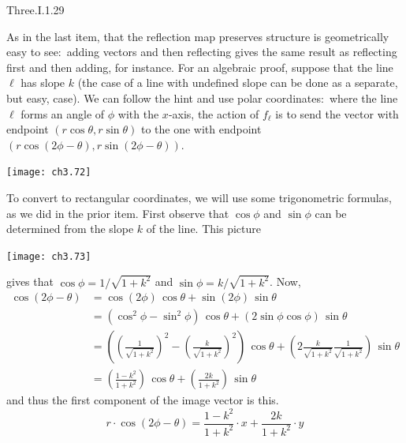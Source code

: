 \begin{ans}{Three.I.1.29}
\begin{exparts}
          As in the last item, that the reflection map preserves
          structure is geometrically easy to see:~adding vectors and then
          reflecting gives the same result as reflecting first and then
          adding, for instance.
          For an algebraic proof, suppose that the line $\ell$ has slope $k$
          (the case of a line with undefined slope can be done as a separate,
          but easy, case).
          We can follow the hint and use
          polar coordinates:~where the line \( \ell \) forms an angle of
          \( \phi \) with the \( x \)-axis, the action of \( f_\ell \) is to
          send the vector with endpoint \( (r\cos\theta,r\sin\theta) \) to
          the one with endpoint
          \( (r\cos(2\phi-\theta),r\sin(2\phi-\theta)) \).
          \begin{center}  \small
            \texttt{[image: ch3.72]}
          \end{center}
          To convert to rectangular coordinates, we will use some trigonometric
          formulas, as we  did in the prior item.
          First observe that $\cos\phi$ and $\sin\phi$ can be determined
          from the slope $k$ of the line.
          This picture
          \begin{center}  \small
            \texttt{[image: ch3.73]}
          \end{center}
          gives that $\cos\phi=1/\sqrt{1+k^2}$ and $\sin\phi=k/\sqrt{1+k^2}$.
          Now,
          \begin{align*}
            \cos(2\phi-\theta)
              &=\cos(2\phi)\,\cos\theta+\sin(2\phi)\,\sin\theta        \\
              &=\left(\cos^2\phi-\sin^2\phi\right)\,\cos\theta
                 +\left(2\sin\phi\cos\phi\right)\,\sin\theta        \\
              &=\left((\frac{1}{\sqrt{1+k^2}})^2
                      -(\frac{k}{\sqrt{1+k^2}})^2\right)
                   \,\cos\theta
                 +\left(2\frac{k}{\sqrt{1+k^2}}\frac{1}{\sqrt{1+k^2}}\right)
                   \,\sin\theta        \\
              &=\left(\frac{1-k^2}{1+k^2}\right)\,\cos\theta
                 +\left(\frac{2k}{1+k^2}\right)\,\sin\theta
          \end{align*}
          and thus the first component of the image vector is this.
          \begin{equation*}
            r\cdot\cos(2\phi-\theta)=\frac{1-k^2}{1+k^2}\cdot x
                                     +\frac{2k}{1+k^2}\cdot y

\end{equation*}
\end{exparts}
\end{ans}
